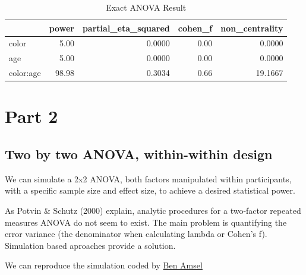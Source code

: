 \documentclass[]{book}
\begin{document}
\begin{table}[t]

\caption{\label{tab:unnamed-chunk-104}Exact ANOVA Result}
\centering
\begin{tabular}{l|r|r|r|r}
\hline
  & power & partial\_eta\_squared & cohen\_f & non\_centrality\\
\hline
color & 5.00 & 0.0000 & 0.00 & 0.0000\\
\hline
age & 5.00 & 0.0000 & 0.00 & 0.0000\\
\hline
color:age & 98.98 & 0.3034 & 0.66 & 19.1667\\
\hline
\end{tabular}
\end{table}

\hypertarget{part-2-1}{%
\section{Part 2}\label{part-2-1}}

\hypertarget{two-by-two-anova-within-within-design}{%
\subsection{Two by two ANOVA, within-within design}\label{two-by-two-anova-within-within-design}}

We can simulate a 2x2 ANOVA, both factors manipulated within participants, with a specific sample size and effect size, to achieve a desired statistical power.

As Potvin \& Schutz (2000) explain, analytic procedures for a two-factor repeated measures ANOVA do not seem to exist. The main problem is quantifying the error variance (the denominator when calculating lambda or Cohen's f). Simulation based aproaches provide a solution.

We can reproduce the simulation coded by \href{https://cognitivedatascientist.com/2015/12/14/power-simulation-in-r-the-repeated-measures-anova-5/}{Ben Amsel}
\end{document}
